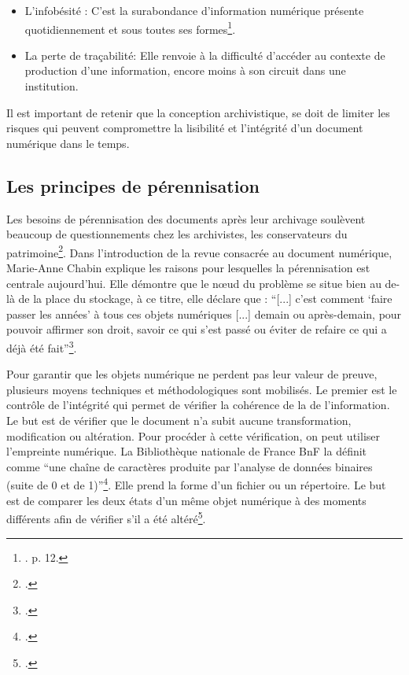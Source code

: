 \begin{itemize}[label=---]
\item{L'infobésité} : C'est la surabondance d'information numérique présente quotidiennement et sous toutes ses formes\footnote{\cite{cigref2011risques}. p. 12.}.
\item{La perte de traçabilité}: Elle renvoie à la difficulté d'accéder au contexte de production d'une information, encore moins à son circuit dans une institution. 

\end{itemize}

Il est important de retenir que la conception archivistique, se doit de limiter les risques qui peuvent compromettre la lisibilité et l'intégrité d'un document numérique dans le temps.


\subsection*{Les principes de pérennisation}

Les besoins de pérennisation des documents après leur archivage soulèvent beaucoup de questionnements chez les archivistes, les conservateurs du patrimoine\footnote{\cite{chabin-2004}.}. Dans l'introduction de la revue consacrée au document numérique, Marie-Anne Chabin explique les raisons pour lesquelles la pérennisation est centrale aujourd'hui. Elle démontre que le nœud du problème se situe bien au de-là de la place du stockage, à ce titre, elle déclare que : \enquote{[...] c'est comment \enquote*{faire passer les années} à tous ces objets numériques [...] demain ou après-demain, pour pouvoir affirmer son droit, savoir ce qui s'est passé ou éviter de refaire ce qui a déjà été fait}\footnote{\cite{chabin-2004}.}. 

Pour garantir que les objets numérique ne perdent pas leur valeur de preuve, plusieurs moyens techniques et méthodologiques sont mobilisés. Le premier est le contrôle de l'intégrité qui permet de vérifier la cohérence de la de l'information. Le but est de vérifier que le document n'a subit aucune transformation, modification ou altération. Pour procéder à cette vérification, on peut utiliser l'empreinte numérique. La Bibliothèque nationale de France BnF la définit comme \enquote{une chaîne de caractères produite par l'analyse de données binaires (suite de 0 et de 1)}\footnote{\cite{bnf_integrite_donnees_numeriques}.}. Elle prend la forme d'un fichier ou un répertoire. Le but est de comparer les deux états d'un même objet numérique à des moments différents afin de vérifier s'il a été altéré\footnote{\cite{bnf_integrite_donnees_numeriques}.}.

